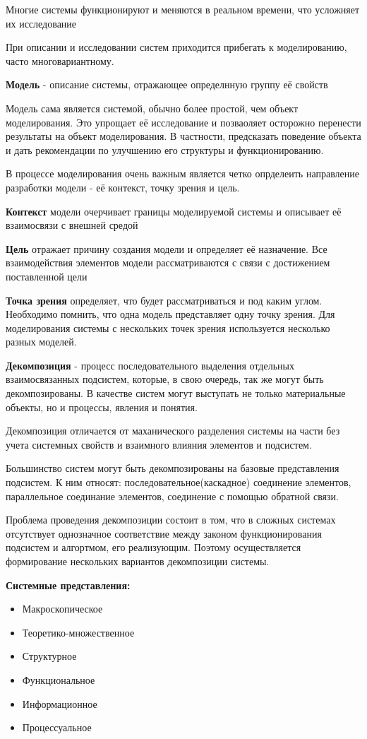 \documentclass[a4paper]{article}
\begin{document}
	Многие системы функционируют и меняются в реальном времени, что усложняет их исследование
	
	При описании и исследовании систем приходится прибегать к моделированию, часто многовариантному.
	
	\textbf{Модель} - описание системы, отражающее определнную группу её свойств
	
	Модель сама является системой, обычно более простой, чем объект моделирования. Это упрощает её исследование и позваоляет осторожно перенести результаты на объект моделирования. В частности, предсказать поведение объекта и дать рекомендации по улучшению его структуры и функционированию.
	
	В процессе моделирования очень важным является четко опрделеить направление разработки модели - её контекст, точку зрения и цель.
	
	\textbf{Контекст} модели очерчивает  границы моделируемой системы и описывает её взаимосвязи с внешней средой
	
	\textbf{Цель} отражает причину создания модели и определяет её назначение. Все взаимодействия элементов модели рассматриваются с связи с достижением поставленной цели
	
	\textbf{Точка зрения} определяет, что будет рассматриваться и под каким углом. Необходимо помнить, что одна модель представляет одну точку зрения. Для моделирования системы с нескольких точек зрения используется несколько разных моделей.
	
	\textbf{Декомпозиция} - процесс последовательного выделения отдельных взаимосвязанных подсистем, которые, в свою очередь, так же могут быть декомпозированы. В качестве систем могут выступать не только материальные объекты, но и процессы, явления и понятия.
	
	Декомпозиция отличается от маханического разделения системы на части без учета системных свойств и взаимного влияния элементов и подсистем.
	
	Большинство систем могут быть декомпозированы на базовые представления подсистем. К ним относят: последовательное(каскадное) соединение элементов, параллельное соединание элементов, соединение с помощью обратной связи.
	
	Проблема проведения декомпозиции состоит в том, что в сложных системах отсутствует однозначное соответствие между законом функционирования подсистем и алгортмом, его реализующим. Поэтому осуществляется формирование нескольких вариантов декомпозиции системы. 
	
	\textbf{Системные представления:}
		\begin{itemize}
		\item Макроскопическое
		\item Теоретико-множественное
		\item Структурное
		\item Функциональное
		\item Информационное
		\item Процессуальное
	\end{itemize}
\end{document}
